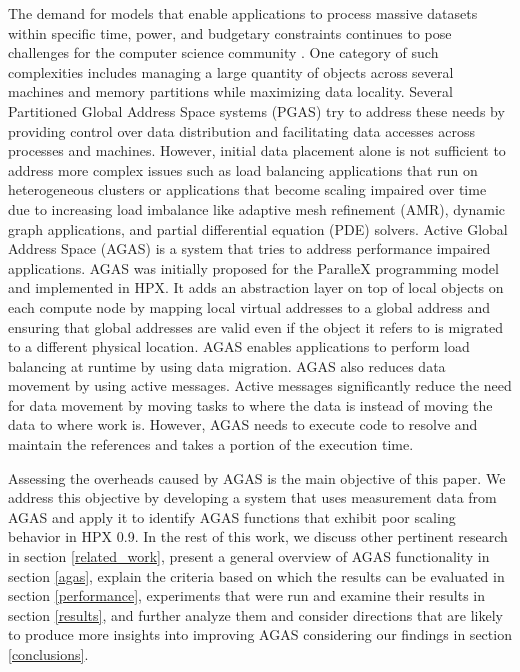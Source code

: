 The demand for models that enable applications to process massive
datasets within specific time, power, and budgetary constraints continues to
pose challenges for the computer science community
\cite{Amarasinghe091exascale,Sterling2009}. One category of such complexities
includes managing a large quantity of objects across several machines and
memory partitions while maximizing data locality. Several Partitioned Global
Address Space systems (PGAS) \cite{pgasorg} try to address these needs by
providing control over data distribution and facilitating data accesses across
processes and machines. However, initial data placement alone is not sufficient
to address more complex issues such as load balancing applications that run on heterogeneous clusters or applications
that become scaling impaired over time due to increasing load imbalance like
adaptive mesh refinement (AMR), dynamic graph applications, and partial
differential equation (PDE) solvers\cite{5364511,Anderson2011a,Dekate2011}.
Active Global Address Space (AGAS) is a system that tries to address
performance impaired applications. AGAS was initially proposed for the ParalleX
programming model\cite{5364511} and implemented in HPX. It adds an abstraction
layer on top of local objects on each compute node by mapping local virtual
addresses to a global address and ensuring that global addresses are valid even
if the object it refers to is migrated to a different physical location. AGAS
enables applications to perform load balancing at runtime by using data
migration.  AGAS also reduces data movement by using active messages. Active
messages significantly reduce the need for data movement by moving tasks to
where the data is instead of moving the data to where work is. 
However, AGAS needs to execute code to resolve and maintain the references and
takes a portion of the execution time. 


Assessing the overheads caused by AGAS is the main objective of this paper. We
address this objective by developing a system that uses measurement data from
AGAS and apply it to identify AGAS functions that exhibit poor scaling
behavior in HPX 0.9. In the rest of this work, we discuss other pertinent
research in section \ref{related_work}, present a general overview of AGAS
functionality in section \ref{agas}, explain the criteria based on which the
results can be evaluated in section \ref{performance}, experiments that were
run and examine their results in section \ref{results}, and further analyze
them and consider directions that are likely to produce more insights into
improving AGAS considering our findings in section \ref{conclusions}.
